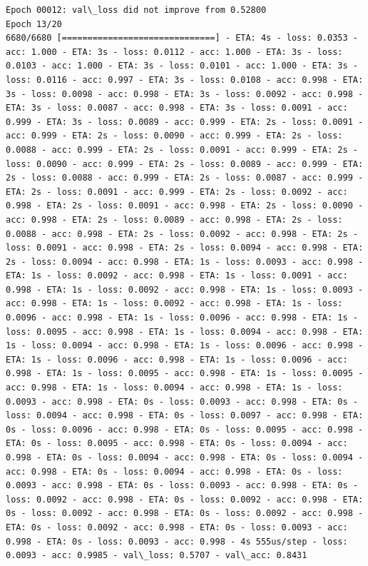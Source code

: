 \documentclass[11pt]{article}
\begin{document}
\begin{Verbatim}[commandchars=\\\{\}]
Epoch 00012: val\_loss did not improve from 0.52800
Epoch 13/20
6680/6680 [==============================] - ETA: 4s - loss: 0.0353 - acc: 1.000 - ETA: 3s - loss: 0.0112 - acc: 1.000 - ETA: 3s - loss: 0.0103 - acc: 1.000 - ETA: 3s - loss: 0.0101 - acc: 1.000 - ETA: 3s - loss: 0.0116 - acc: 0.997 - ETA: 3s - loss: 0.0108 - acc: 0.998 - ETA: 3s - loss: 0.0098 - acc: 0.998 - ETA: 3s - loss: 0.0092 - acc: 0.998 - ETA: 3s - loss: 0.0087 - acc: 0.998 - ETA: 3s - loss: 0.0091 - acc: 0.999 - ETA: 3s - loss: 0.0089 - acc: 0.999 - ETA: 2s - loss: 0.0091 - acc: 0.999 - ETA: 2s - loss: 0.0090 - acc: 0.999 - ETA: 2s - loss: 0.0088 - acc: 0.999 - ETA: 2s - loss: 0.0091 - acc: 0.999 - ETA: 2s - loss: 0.0090 - acc: 0.999 - ETA: 2s - loss: 0.0089 - acc: 0.999 - ETA: 2s - loss: 0.0088 - acc: 0.999 - ETA: 2s - loss: 0.0087 - acc: 0.999 - ETA: 2s - loss: 0.0091 - acc: 0.999 - ETA: 2s - loss: 0.0092 - acc: 0.998 - ETA: 2s - loss: 0.0091 - acc: 0.998 - ETA: 2s - loss: 0.0090 - acc: 0.998 - ETA: 2s - loss: 0.0089 - acc: 0.998 - ETA: 2s - loss: 0.0088 - acc: 0.998 - ETA: 2s - loss: 0.0092 - acc: 0.998 - ETA: 2s - loss: 0.0091 - acc: 0.998 - ETA: 2s - loss: 0.0094 - acc: 0.998 - ETA: 2s - loss: 0.0094 - acc: 0.998 - ETA: 1s - loss: 0.0093 - acc: 0.998 - ETA: 1s - loss: 0.0092 - acc: 0.998 - ETA: 1s - loss: 0.0091 - acc: 0.998 - ETA: 1s - loss: 0.0092 - acc: 0.998 - ETA: 1s - loss: 0.0093 - acc: 0.998 - ETA: 1s - loss: 0.0092 - acc: 0.998 - ETA: 1s - loss: 0.0096 - acc: 0.998 - ETA: 1s - loss: 0.0096 - acc: 0.998 - ETA: 1s - loss: 0.0095 - acc: 0.998 - ETA: 1s - loss: 0.0094 - acc: 0.998 - ETA: 1s - loss: 0.0094 - acc: 0.998 - ETA: 1s - loss: 0.0096 - acc: 0.998 - ETA: 1s - loss: 0.0096 - acc: 0.998 - ETA: 1s - loss: 0.0096 - acc: 0.998 - ETA: 1s - loss: 0.0095 - acc: 0.998 - ETA: 1s - loss: 0.0095 - acc: 0.998 - ETA: 1s - loss: 0.0094 - acc: 0.998 - ETA: 1s - loss: 0.0093 - acc: 0.998 - ETA: 0s - loss: 0.0093 - acc: 0.998 - ETA: 0s - loss: 0.0094 - acc: 0.998 - ETA: 0s - loss: 0.0097 - acc: 0.998 - ETA: 0s - loss: 0.0096 - acc: 0.998 - ETA: 0s - loss: 0.0095 - acc: 0.998 - ETA: 0s - loss: 0.0095 - acc: 0.998 - ETA: 0s - loss: 0.0094 - acc: 0.998 - ETA: 0s - loss: 0.0094 - acc: 0.998 - ETA: 0s - loss: 0.0094 - acc: 0.998 - ETA: 0s - loss: 0.0094 - acc: 0.998 - ETA: 0s - loss: 0.0093 - acc: 0.998 - ETA: 0s - loss: 0.0093 - acc: 0.998 - ETA: 0s - loss: 0.0092 - acc: 0.998 - ETA: 0s - loss: 0.0092 - acc: 0.998 - ETA: 0s - loss: 0.0092 - acc: 0.998 - ETA: 0s - loss: 0.0092 - acc: 0.998 - ETA: 0s - loss: 0.0092 - acc: 0.998 - ETA: 0s - loss: 0.0093 - acc: 0.998 - ETA: 0s - loss: 0.0093 - acc: 0.998 - 4s 555us/step - loss: 0.0093 - acc: 0.9985 - val\_loss: 0.5707 - val\_acc: 0.8431


\end{Verbatim}
\end{document}
